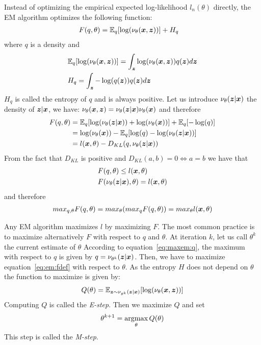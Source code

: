 Instead of optimizing the empirical expected log-likelihood $l_n(\theta)$ directly, the EM algorithm optimizes the following function:
\begin{align}
  F(q, \theta) &= \mathbb{E}_q[\log( \nu_{\theta}(\boldsymbol{x}, \boldsymbol{z}))] + H_q \label{eq:em:fdef}
\end{align}
where $q$ is a density and 
\begin{align}
  &\mathbb{E}_q[\log( \nu_{\theta}(\boldsymbol{x}, \boldsymbol{z}))] = \int_{\boldsymbol{z}} \log( \nu_{\theta}(\boldsymbol{x}, \boldsymbol{z})) q(\boldsymbol{z}) d\boldsymbol{z}  \\
  &H_q = \int_{\boldsymbol{z}} -\log(q(\boldsymbol{z})) q(\boldsymbol{z}) d\boldsymbol{z} 
\end{align}
$H_q$ is called the entropy of $q$ and is always positive.
Let us introduce $\nu_{\theta}(\boldsymbol{z} | \boldsymbol{x})$ the density of $\boldsymbol{z} | \boldsymbol{x}$, we have:
$\nu_{\theta}(\boldsymbol{x}, \boldsymbol{z}) = \nu_{\theta}(\boldsymbol{z} | \boldsymbol{x}) \nu_{\theta}(\boldsymbol{x})$ and
therefore
\begin{align}
  F(q, \theta) &= \mathbb{E}_q[\log( \nu_{\theta}(\boldsymbol{z}| \boldsymbol{x})) + \log( \nu_{\theta}(\boldsymbol{x}))] + \mathbb{E}_q[-\log(q)] \\
  &= \log(\nu_{\theta}(\boldsymbol{x})) - \mathbb{E}_q[ \log(q) - \log( \nu_{\theta}(\boldsymbol{z}| \boldsymbol{x}))] \\
               &= l(\boldsymbol{x}, \theta) - D_{KL}(q, \nu_{\theta}(\boldsymbol{z}| \boldsymbol{x}))
\end{align}
From the fact that $D_{KL}$ is positive and $D_{KL}(a, b) = 0 \iff a = b$ we
have that
\begin{align}
  &F(q, \theta) \leq l(\boldsymbol{x}, \theta) \\
  &F(\nu_{\theta}(\boldsymbol{z}| \boldsymbol{x}), \theta) = l(\boldsymbol{x}, \theta) \label{eq:maxem:q}
\end{align}
and therefore
\begin{align}
  max_{q, \theta} F(q, \theta) = max_{\theta} (max_q F(q, \theta)) = max_{\theta} l(\boldsymbol{x}, \theta)
\end{align}

Any EM algorithm maximizes $l$ by maximizing $F$.
The most common practice is to maximize alternatively $F$ with respect to
$q$ and $\theta$.
At iteration $k$, let us call $\theta^k$ the current estimate of $\theta$
According to equation~\eqref{eq:maxem:q}, the maximum with
respect to $q$ is given by $q=\nu_{\theta^k}(\boldsymbol{z}| \boldsymbol{x})$. Then, we have to
maximize equation~\eqref{eq:em:fdef} with respect to $\theta$.
As the entropy $H$ does not depend on $\theta$ the function to maximize is given
by:
\begin{align}
  Q(\theta ) =  \mathbb{E}_{\boldsymbol{z} \sim \nu_{\theta^k }(\boldsymbol{z} | \boldsymbol{x})}[\log( \nu_{\theta }(\boldsymbol{x}, \boldsymbol{z}))]
\end{align}
Computing $Q$ is called the \emph{E-step}. Then we maximize $Q$ and set
\begin{align}
  \theta^{k+1} = \operatorname*{argmax}_{\theta} Q(\theta) \label{eq:exact:mstep}
\end{align}
This step is called the \emph{M-step}.


